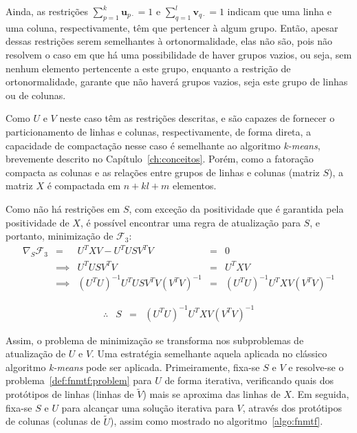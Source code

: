 \documentclass[
    12pt,                %
    oneside,            %
    a4paper,            %
    english,            %
    brazil                %
    ]{abntex2ppgsi}
\begin{document}
Ainda, as restrições $\sum_{p=1}^{k} \mathbf{u}_{p \cdot} = 1$ e $\sum_{q=1}^{l} \mathbf{v}_{q \cdot} = 1$ indicam que uma linha e uma coluna, respectivamente, têm que pertencer à algum grupo.
Então, apesar dessas restrições serem semelhantes à ortonormalidade, elas não são, pois não resolvem o caso em que há uma possibilidade de haver grupos vazios, ou seja, sem nenhum elemento pertencente a este grupo, enquanto a restrição de ortonormalidade, garante que não haverá grupos vazios, seja este grupo de linhas ou de colunas.

Como $U$ e $V$ neste caso têm as restrições descritas, e são capazes de fornecer o particionamento de linhas e colunas, respectivamente, de forma direta, a capacidade de compactação nesse caso é semelhante ao algoritmo \textit{k-means}, brevemente descrito no Capítulo~\ref{ch:conceitos}.
Porém, como a fatoração compacta as colunas e as relações entre grupos de linhas e colunas (matriz $S$), a matriz $X$ é compactada em $n + kl + m$ elementos.

Como não há restrições em $S$, com exceção da positividade que é garantida pela positividade de $X$, é possível encontrar uma regra de atualização para $S$, e portanto, minimização de $\mathcal{F}_3$:
\[
\begin{array}{lclcl}
\nabla_S \mathcal{F}_3 &     =    & U^T X V - U^T U S V^T V                     & = & 0                             \\
& \implies & U^T U S V^T V                               & = & U^T X V                       \\
& \implies & (U^T U)^{-1} U^T U S V^T V (V^T V)^{-1} & = & (U^T U)^{-1} U^T X V (V^T V)^{-1}
\end{array}   \nonumber
\]

\begin{equation}
\label{eq:fnmtf:updateS}
\begin{array}{lclcl}
\therefore & S & = & (U^T U)^{-1} U^T X V (V^T V)^{-1}    \nonumber
\end{array}
\end{equation}

Assim, o problema de minimização se transforma nos subproblemas de atualização de $U$ e $V$.
Uma estratégia semelhante aquela aplicada no clássico algoritmo \textit{k-means} pode ser aplicada.
Primeiramente, fixa-se $S$ e $V$ e resolve-se o problema~\ref{def:fnmtf:problem} para $U$ de forma iterativa, verificando quais dos protótipos de linhas (linhas de $\widetilde{V}$) mais se aproxima das linhas de $X$.
Em seguida, fixa-se $S$ e $U$ para alcançar uma solução iterativa para $V$, através dos protótipos de colunas (colunas de $\widetilde{U}$), assim como mostrado no algoritmo~\ref{algo:fnmtf}.
\end{document}
